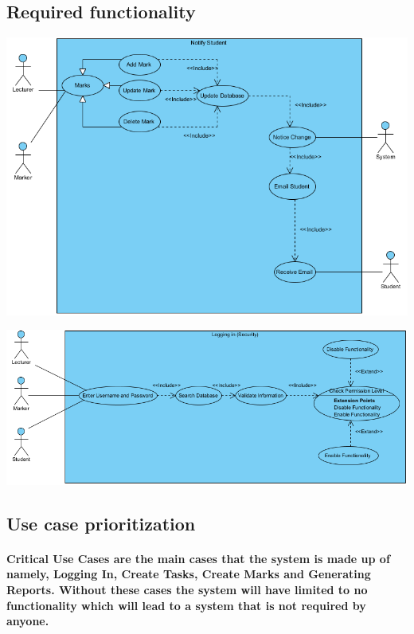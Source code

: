 \documentclass[12pt]{article}
\begin{document}
  \subsection{Required functionality}  
  \begin{center}
  \advance\leftskip-1.0cm
  \includegraphics[width=160mm]{UseCaseDiagram2.png}  
  \end{center}
  \begin{center}
  \advance\leftskip-1.3cm
  \includegraphics[width=160mm]{UseCaseDiagram3.png}  
  \end{center}
 \subsection{Use case prioritization}
 \paragraph*{Critical Use Cases are the main cases that the system is made up of namely, Logging In, Create Tasks, Create Marks and Generating Reports. Without these cases the system will have limited to no functionality which will lead to a system that is not required by anyone.}
\end{document}
